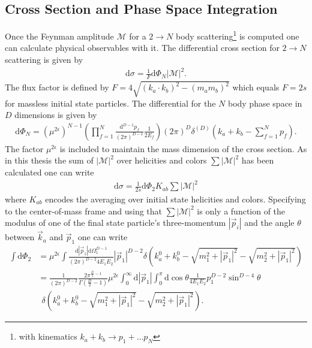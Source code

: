 \subsection{Cross Section and Phase Space Integration}\label{sec:cross_section}
Once the Feynman amplitude $\mathcal{M}$ for a $2 \to N$ body scattering\footnote{with kinematics $k_a + k_b \to p_1 + \hdots p_N$} is computed one can calculate physical observables with it. The differential cross section for $2 \to N$ scattering is given by
\begin{align}
\mbox{d}\sigma = \frac{1}{F}\mathrm{d}\Phi_N |\mathcal{M}|^2.
\end{align}
The flux factor is defined by $F = 4\sqrt{(k_a\cdot k_b)^2 - (m_am_b)^2}$ which equals $F = 2s$ for massless initial state particles. The differential for the $N$ body phase space in $D$ dimensions is given by
\begin{align}
\mathrm{d}\Phi_N = \left( \mu^{2\epsilon} \right)^{N-1} \left( \prod_{f=1}^N \frac{\mbox{d}^{D-1}p_f}{(2\pi)^{D-1}}\frac{1}{2E_f} \right)  (2\pi)^D \delta^{(D)}(k_a+k_b-\sum_{f=1}^N p_f).
\end{align} 
The factor $\mu^{2\epsilon}$ is included to maintain the mass dimension of the cross section. As in this thesis the sum of $|\mathcal{M}|^2$ over helicities and colors $\sum |\mathcal{M}|^2$ has been calculated one can write
\begin{align}
\mathrm{d}\sigma = \frac{1}{2s} \mathrm{d}\Phi_2 K_{ab} \sum |\mathcal{M}|^2
\end{align} 
where $K_{ab}$ encodes the averaging over initial state helicities and colors. Specifying to the center-of-mass frame and using that $\sum|\mathcal{M}|^2$ is only a function of the modulus of one of the final state particle's three-momentum $ |\vec{p}_i|$ and the angle $\theta$ between $\vec{k}_a$ and $\vec{p}_1$ one can write
\begin{align}
\int \mathrm{d}\Phi_2 &= \mu^{2\epsilon} \int \frac{\mathrm{d}|\vec{p}_1|\mathrm{d}\Omega^{D-1}_1}{(2\pi)^{D-2} 4 E_1 E_2} |\vec{p}_1|^{D-2} \delta \left(k_a^0 + k_b^0 - \sqrt{m_1^2 + |\vec{p}_1|^2} - \sqrt{m_2^2 + |\vec{p}_1|^2} \right)\nonumber\\
&= \frac{1}{(2\pi)^{D-2}}\frac{2\pi^{\frac{D}{2}-1}}{\Gamma(\frac{D}{2}-1)} \mu^{2\epsilon} \int_0^\infty\mathrm{d}|\vec{p}_1| \int_0^\pi \mathrm{d} \cos\theta \frac{1}{4 E_1 E_2} p_1^{D-2}\sin^{D-4}\theta\nonumber\\
&\ \ \delta \left(k_a^0 + k_b^0 - \sqrt{m_1^2 + |\vec{p}_1|^2} - \sqrt{m_2^2 + |\vec{p}_1|^2} \right).\label{eq:DPhi2}
\end{align}
